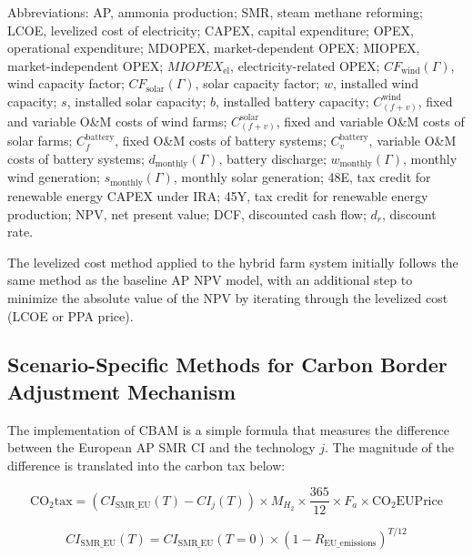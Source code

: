 \documentclass{article}
\begin{document}
\begin{table}[H]
\begin{tabular}{@{}p{4cm}p{1.5cm}p{8cm}@{}}
  \end{tabular}
  \begin{tablenotes}
  \small
  \item Abbreviations: AP, ammonia production; SMR, steam methane reforming; LCOE, levelized cost of electricity; CAPEX, capital expenditure; OPEX, operational expenditure; MDOPEX, market-dependent OPEX; MIOPEX, market-independent OPEX; $MIOPEX_{\text{el}}$, electricity-related OPEX; $CF_{\text{wind}}(\Gamma)$, wind capacity factor; $CF_{\text{solar}}(\Gamma)$, solar capacity factor; $w$, installed wind capacity; $s$, installed solar capacity; $b$, installed battery capacity; $C_{(f+v)}^{\text{wind}}$, fixed and variable O\&M costs of wind farms; $C_{(f+v)}^{\text{solar}}$, fixed and variable O\&M costs of solar farms; $C_f^{\text{battery}}$, fixed O\&M costs of battery systems; $C_v^{\text{battery}}$, variable O\&M costs of battery systems; $d_{\text{monthly}}(\Gamma)$, battery discharge; $w_{\text{monthly}}(\Gamma)$, monthly wind generation; $s_{\text{monthly}}(\Gamma)$, monthly solar generation; 48E, tax credit for renewable energy CAPEX under IRA; 45Y, tax credit for renewable energy production; NPV, net present value; DCF, discounted cash flow; $d_r$, discount rate.
\end{tablenotes}

\end{table}

The levelized cost method applied to the hybrid farm system initially follows the same method as the baseline AP NPV model, with an additional step to minimize the absolute value of the NPV by iterating through the levelized cost (LCOE or PPA price).

\subsection{Scenario-Specific Methods for Carbon Border Adjustment Mechanism}

The implementation of CBAM is a simple formula that measures the difference between the European AP SMR CI and the technology \( j \). The magnitude of the difference is translated into the carbon tax below:

\begin{equation}
\text{CO}_2\text{tax} = \left(CI_{\text{SMR\_EU}}(T) - CI_j(T)\right) \times M_{H_2} \times \frac{365}{12} \times F_a \times \text{CO}_2\text{EUPrice}
\label{eq:E4}
\end{equation}

\begin{equation}
CI_{\text{SMR\_EU}}(T) = CI_{\text{SMR\_EU}}(T=0) \times \left(1 - R_{\text{EU\_emissions}}\right)^{T/12}
\label{eq:E5}
\end{equation}
\end{document}
